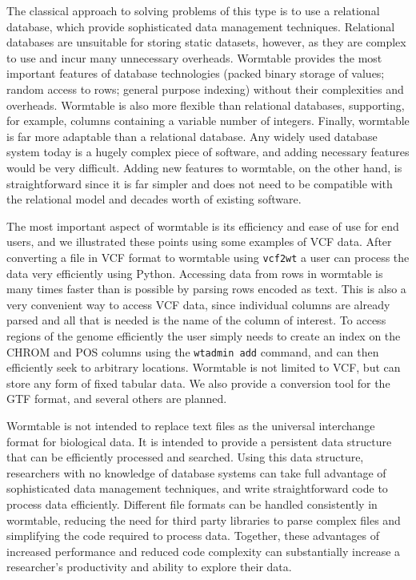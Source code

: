 \documentclass[10pt]{bmc_article}
\newenvironment{bmcformat}{\begin{raggedright}\baselineskip20pt\sloppy\setboolean{publ}{false}}{\end{raggedright}\baselineskip20pt\sloppy}
\begin{document}
\begin{bmcformat}
The classical approach to solving problems of this type 
is to use a relational database, which provide sophisticated 
data management techniques. Relational databases are unsuitable 
for storing static datasets, however, as they are complex to 
use and incur many unnecessary overheads.
Wormtable provides the most important features of database
technologies (packed binary storage of values; random access 
to rows; general purpose indexing) without their complexities 
and overheads. Wormtable is also more flexible than 
relational databases, supporting, for example, columns 
containing a variable number of integers. Finally, wormtable 
is far more adaptable than a relational database.
Any widely used database system today is a hugely complex 
piece of software, and adding necessary features would be 
very difficult. Adding new features to wormtable, on the 
other hand, is straightforward since it is far simpler and 
does not need to be compatible with the relational model
and decades worth of existing software.

The most important aspect of wormtable is its efficiency
and ease of use for end users, and we illustrated these
points using some examples of VCF data.
After converting a file in VCF format to 
wormtable using \texttt{vcf2wt} a user can process the 
data very efficiently using Python. Accessing data from 
rows in wormtable is many times faster than is possible 
by parsing rows encoded as text.
This is also a very convenient 
way to access VCF data, since individual columns are already 
parsed and all that is needed is the name of the column of 
interest. To access regions of the genome efficiently
the user simply needs to create an index on the CHROM and POS columns
using the  \texttt{wtadmin add} command, and can then efficiently
seek to arbitrary locations. Wormtable is not 
limited to VCF, but can store
any form of fixed tabular data. We also provide a conversion 
tool for the GTF format, and several others are planned.

Wormtable is not intended to replace text files as the universal 
interchange format for biological data. 
It is intended to provide a persistent data structure 
that can be efficiently processed 
and searched. Using this data structure, researchers with no knowledge of 
database systems can take full advantage of sophisticated 
data management techniques, and write straightforward code to process 
data efficiently. 
Different file formats can be handled consistently 
in wormtable, reducing the need for third party libraries 
to parse complex files and simplifying the code required 
to process data.
Together, these advantages of increased performance and reduced 
code complexity can substantially increase a researcher's 
productivity and ability to explore their data.



\end{bmcformat}
\end{document}
